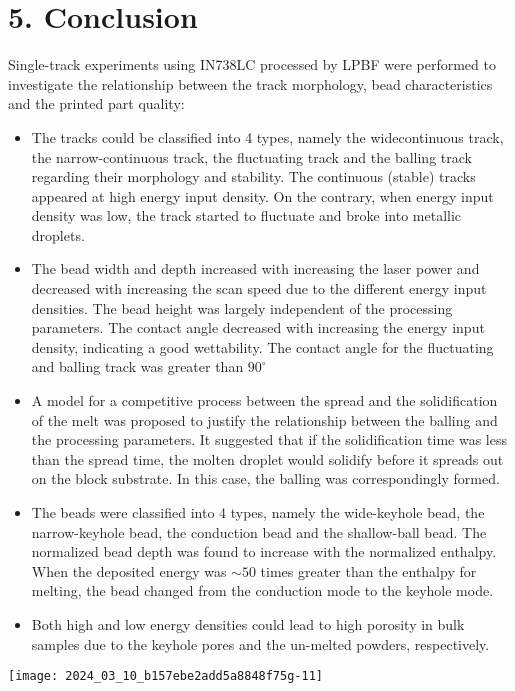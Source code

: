 \documentclass[10pt]{article}
\begin{document}
\section*{5. Conclusion}
Single-track experiments using IN738LC processed by LPBF were performed to investigate the relationship between the track morphology, bead characteristics and the printed part quality:

\begin{itemize}
  \item The tracks could be classified into 4 types, namely the widecontinuous track, the narrow-continuous track, the fluctuating track and the balling track regarding their morphology and stability. The continuous (stable) tracks appeared at high energy input density. On the contrary, when energy input density was low, the track started to fluctuate and broke into metallic droplets.
  \item The bead width and depth increased with increasing the laser power and decreased with increasing the scan speed due to the different energy input densities. The bead height was largely independent of the processing parameters. The contact angle decreased with increasing the energy input density, indicating a good wettability. The contact angle for the fluctuating and balling track was greater than $90^{\circ}$
  \item A model for a competitive process between the spread and the solidification of the melt was proposed to justify the relationship between the balling and the processing parameters. It suggested that if the solidification time was less than the spread time, the molten droplet would solidify before it spreads out on the block substrate. In this case, the balling was correspondingly formed.
  \item The beads were classified into 4 types, namely the wide-keyhole bead, the narrow-keyhole bead, the conduction bead and the shallow-ball bead. The normalized bead depth was found to increase with the normalized enthalpy. When the deposited energy was $\sim 50$ times greater than the enthalpy for melting, the bead changed from the conduction mode to the keyhole mode.
  \item Both high and low energy densities could lead to high porosity in bulk samples due to the keyhole pores and the un-melted powders, respectively.
\end{itemize}

\begin{center}
\texttt{[image: 2024\_03\_10\_b157ebe2add5a8848f75g-11]}
\end{center}
\end{document}

